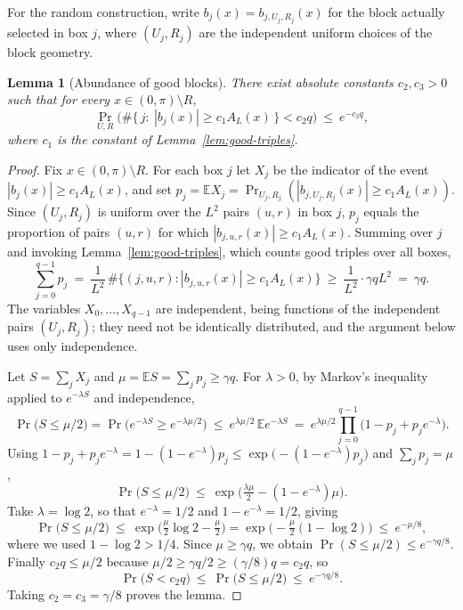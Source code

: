 \documentclass[11pt,reqno]{amsart}
\theoremstyle{plain}
\newtheorem{lemma}{Lemma}
\theoremstyle{definition}
\theoremstyle{remark}
\begin{document}
For the random construction, write $b_j(x)=b_{j,U_j,R_j}(x)$ for the block actually selected in box $j$, where $(U_j,R_j)$ are the independent uniform choices of the block geometry.

\begin{lemma}[Abundance of good blocks]\label{lem:abundance}
There exist absolute constants $c_2,c_3>0$ such that for every $x\in(0,\pi)\setminus R$,
\[
\Pr_{U,R}\Big(\#\{\,j:\ |b_j(x)|\ge c_1 A_L(x)\,\}<c_2 q\Big)\ \le\ e^{-c_3 q},
\]
where $c_1$ is the constant of Lemma~\textup{\ref{lem:good-triples}}.
\end{lemma}

\begin{proof}
Fix $x\in(0,\pi)\setminus R$. For each box $j$ let $X_j$ be the indicator of the event $|b_j(x)|\ge c_1 A_L(x)$, and set $p_j=\mathbb{E}X_j=\Pr_{U_j,R_j}(|b_{j,U_j,R_j}(x)|\ge c_1 A_L(x))$. Since $(U_j,R_j)$ is uniform over the $L^2$ pairs $(u,r)$ in box $j$, $p_j$ equals the proportion of pairs $(u,r)$ for which $|b_{j,u,r}(x)|\ge c_1 A_L(x)$. Summing over $j$ and invoking Lemma~\ref{lem:good-triples}, which counts good triples over all boxes,
\[
\sum_{j=0}^{q-1}p_j\ =\ \frac{1}{L^2}\,\#\{(j,u,r):|b_{j,u,r}(x)|\ge c_1 A_L(x)\}\ \ge\ \frac{1}{L^2}\cdot\gamma qL^2\ =\ \gamma q .
\]
The variables $X_0,\dots,X_{q-1}$ are independent, being functions of the independent pairs $(U_j,R_j)$; they need not be identically distributed, and the argument below uses only independence.

Let $S=\sum_{j}X_j$ and $\mu=\mathbb{E}S=\sum_j p_j\ge\gamma q$. For $\lambda>0$, by Markov's inequality applied to $e^{-\lambda S}$ and independence,
\[
\Pr\big(S\le \mu/2\big)=\Pr\big(e^{-\lambda S}\ge e^{-\lambda\mu/2}\big)
\ \le\ e^{\lambda\mu/2}\,\mathbb{E}e^{-\lambda S}
\ =\ e^{\lambda\mu/2}\prod_{j=0}^{q-1}\big(1-p_j+p_j e^{-\lambda}\big).
\]
Using $1-p_j+p_j e^{-\lambda}=1-(1-e^{-\lambda})p_j\le\exp\big(-(1-e^{-\lambda})p_j\big)$ and $\sum_j p_j=\mu$,
\[
\Pr\big(S\le\mu/2\big)\ \le\ \exp\!\Big(\tfrac{\lambda\mu}{2}-(1-e^{-\lambda})\mu\Big).
\]
Take $\lambda=\log 2$, so that $e^{-\lambda}=1/2$ and $1-e^{-\lambda}=1/2$, giving
\[
\Pr\big(S\le\mu/2\big)\ \le\ \exp\!\Big(\tfrac{\mu}{2}\log 2-\tfrac{\mu}{2}\Big)
=\exp\!\Big(-\tfrac{\mu}{2}(1-\log 2)\Big)\ \le\ e^{-\mu/8},
\]
where we used $1-\log 2>1/4$. Since $\mu\ge\gamma q$, we obtain $\Pr(S\le\mu/2)\le e^{-\gamma q/8}$. Finally $c_2 q\le\mu/2$ because $\mu/2\ge\gamma q/2\ge (\gamma/8)q=c_2 q$, so
\[
\Pr\big(S<c_2 q\big)\ \le\ \Pr\big(S\le \mu/2\big)\ \le\ e^{-\gamma q/8}.
\]
Taking $c_2=c_3=\gamma/8$ proves the lemma.
\end{proof}
\end{document}
